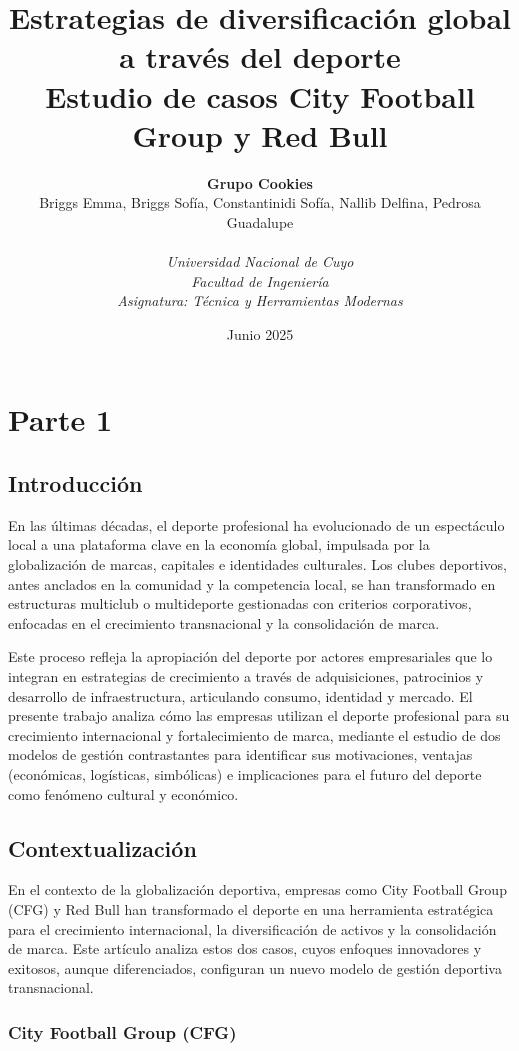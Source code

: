 \documentclass[12pt,a4paper]{article}
\title{\textbf{Estrategias de diversificación global a través del deporte}\\[0.5em]
\large Estudio de casos City Football Group y Red Bull}
\author{
\textbf{Grupo Cookies}\\[0.5em]
    Briggs Emma, Briggs Sofía, Constantinidi Sofía, Nallib Delfina, Pedrosa Guadalupe\\[3em]
\\
\textit{Universidad Nacional de Cuyo} \\
\textit{Facultad de Ingeniería} \\
\textit{Asignatura: Técnica y Herramientas Modernas}
}
\date{Junio 2025}
\begin{document}
\maketitle
\thispagestyle{empty}
\newpage

\section{Parte 1}

\subsection{Introducción}

En las últimas décadas, el deporte profesional ha evolucionado de un espectáculo local a una plataforma clave en la economía global, impulsada por la globalización de marcas, capitales e identidades culturales. Los clubes deportivos, antes anclados en la comunidad y la competencia local, se han transformado en estructuras multiclub o multideporte gestionadas con criterios corporativos, enfocadas en el crecimiento transnacional y la consolidación de marca.

Este proceso refleja la apropiación del deporte por actores empresariales que lo integran en estrategias de crecimiento a través de adquisiciones, patrocinios y desarrollo de infraestructura, articulando consumo, identidad y mercado. El presente trabajo analiza cómo las empresas utilizan el deporte profesional para su crecimiento internacional y fortalecimiento de marca, mediante el estudio de dos modelos de gestión contrastantes para identificar sus motivaciones, ventajas (económicas, logísticas, simbólicas) e implicaciones para el futuro del deporte como fenómeno cultural y económico.

\subsection{Contextualización}

En el contexto de la globalización deportiva, empresas como City Football Group (CFG) y Red Bull han transformado el deporte en una herramienta estratégica para el crecimiento internacional, la diversificación de activos y la consolidación de marca. Este artículo analiza estos dos casos, cuyos enfoques innovadores y exitosos, aunque diferenciados, configuran un nuevo modelo de gestión deportiva transnacional.

\subsubsection{City Football Group (CFG)}
\end{document}
